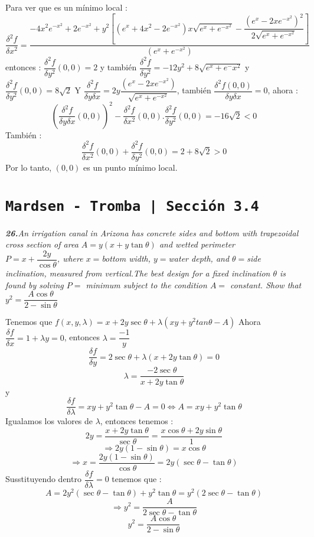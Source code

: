 \documentclass[a4paper,12pt]{article}
\begin{document}
\begin{itemize}
		Para ver que es un mínimo local : 
		\[\dfrac{\delta^2 f}{\delta x^2}=\dfrac{-4x^2e^{-x^2}+2e^{-x^2}+y^2 \left[ \left( e^x+ 4x^2-2e^{-x^2}\right)x \sqrt{e^x+e^{-x^2}}- \dfrac{\left(e^x- 2xe^{-x^2} \right)^2}{2 \sqrt{e^x+ e^{-x^2}}} \right]}{\left(e^x+ e^{-x^2} \right)}\]
		entonces : $\dfrac{\delta ^2 f}{\delta y^2}(0,0) = 2 $ y también $\dfrac{\delta ^2 f}{\delta y^2}= -12y^2+ 8 \sqrt{e^x + e^-x^2}$
		y $\dfrac{\delta ^2 f}{\delta y^2}(0,0)= 8 \sqrt{2}$ Y $\dfrac{\delta^2 f}{\delta y \delta x}= 2y \dfrac{(e^x- 2xe^{-x^2})}{\sqrt{e^x+ e^{-x^2}}}$, también $\dfrac{\delta^2 f(0,0)}{\delta y \delta x}= 0$, ahora :
		\[\left(\dfrac{\delta^2 f}{\delta y \delta x}(0,0) \right)^2 - \dfrac{\delta^2 f}{\delta x^2}(0,0).\dfrac{\delta ^2 f}{\delta y^2}(0,0) = -16\sqrt{2}<0\]
		También : 
		\[\dfrac{\delta ^2 f}{\delta x^2}(0,0)+\dfrac{\delta ^2 f}{\delta y^2}(0,0)= 2+8\sqrt{2}> 0\]
		Por lo tanto, $(0,0)$ es un punto mínimo local.
	\end{itemize}

\section{\texttt{Mardsen - Tromba | Sección 3.4}}

\textit{\textbf{26.}An irrigation canal in Arizona has concrete sides and bottom with trapezoidal cross section of area
 $A = y(x + y \tan \theta)$ and wetted perimeter \\
 $P = x + \dfrac{2y}{\cos \theta}$, where $x = $bottom width, $y = $water depth, and $\theta =$side inclination, measured
 from vertical.The best design for a fixed inclination $\theta$ is found by solving $P =$ minimum subject to the condition
 $A =$ constant. Show that $y^2 =\dfrac{A \cos \theta}{2 - \sin \theta}$ 
}

Tenemos que $f(x,y, \lambda) = x+ 2y \sec \theta + \lambda(xy+ y^2 tan\theta - A)$
Ahora $\dfrac{\delta f}{\delta x}= 1+ \lambda y = 0$, entonces $\lambda = \dfrac{-1}{y}$
\[\dfrac{\delta f}{\delta y} = 2 \sec \theta + \lambda(x + 2y\tan \theta)= 0\]
\[\lambda = \dfrac{-2 \sec\theta}{x+2y \tan \theta}\] 
y 
\[\dfrac{\delta f}{\delta \lambda} = xy+ y^2 \tan \theta - A =0 \Longleftrightarrow A = xy+ y^2 \tan \theta\]
Igualamos los valores de $\lambda$, entonces tenemos :
\[2y = \dfrac{x+ 2y \tan \theta}{\sec \theta}= \dfrac{x\cos \theta+ 2y \sin \theta}{1}\]
\[\Rightarrow 2y(1-\sin \theta) = x \cos \theta\]
\[\Rightarrow x = \dfrac{2y(1-\sin \theta)}{\cos \theta}= 2y (\sec \theta - \tan \theta)\]
Susstituyendo dentro $\dfrac{\delta f}{\delta \lambda} = 0$ tenemos que :
\[A = 2y^2(\sec \theta - \tan \theta)+ y^2\tan \theta = y^2 (2 \sec\theta - \tan \theta)\]
\[\Rightarrow y^2 = \dfrac{A}{2\sec \theta - \tan \theta}\]
\[y^2 = \dfrac{A \cos \theta}{2- \sin \theta}\]
\end{document}
